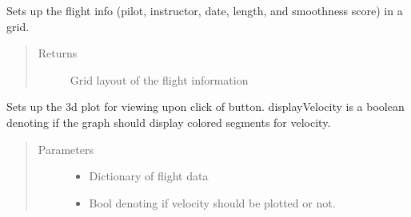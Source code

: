 \documentclass[letterpaper,10pt,english]{sphinxmanual}
\begin{document}
\begin{fulllineitems}
\begin{fulllineitems}
\begin{quote}
\begin{description}
\end{description}\end{quote}

\end{fulllineitems}


\begin{fulllineitems}
\label{\detokenize{index:src.Views.View_ReportScreen.ReportWindow.setupFlightInfo}}
Sets up the flight info (pilot, instructor, date, length, and smoothness score) in a grid.
\begin{quote}\begin{description}
\item[{Returns}] \leavevmode
Grid layout of the flight information

\end{description}\end{quote}

\end{fulllineitems}


\begin{fulllineitems}
\label{\detokenize{index:src.Views.View_ReportScreen.ReportWindow.setupGraph}}
Sets up the 3d plot for viewing upon click of button. displayVelocity is a boolean denoting if the graph should
display colored segments for velocity.
\begin{quote}\begin{description}
\item[{Parameters}] \leavevmode\begin{itemize}
\item {} 
 \textendash{} Dictionary of flight data

\item {} 
 \textendash{} Bool denoting if velocity should be plotted or not.


\end{itemize}
\end{description}
\end{quote}
\end{fulllineitems}
\end{fulllineitems}
\end{document}

